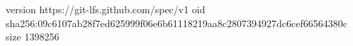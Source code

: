 version https://git-lfs.github.com/spec/v1
oid sha256:09c6107ab28f7ed625999f06e6b61118219aa8c2807394927dc6cef66564380c
size 1398256
